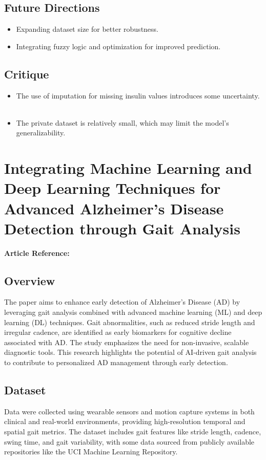 \subsection*{Future Directions}
\begin{itemize}
    \item Expanding dataset size for better robustness.
    \item Integrating fuzzy logic and optimization for improved prediction.
\end{itemize}

\subsection*{Critique}
\begin{itemize}
    \item The use of imputation for missing insulin values introduces some uncertainty.    
    \item The private dataset is relatively small, which may limit the model's generalizability.    
\end{itemize}

\section{Integrating Machine Learning and Deep Learning Techniques for Advanced Alzheimer's Disease Detection through Gait Analysis}
\textbf{Article Reference:} \cite{article_3}

\subsection*{Overview}
The paper aims to enhance early detection of Alzheimer's Disease (AD) by leveraging gait analysis combined with advanced machine learning (ML) and deep learning (DL) techniques. Gait abnormalities, such as reduced stride length and irregular cadence, are identified as early biomarkers for cognitive decline associated with AD. The study emphasizes the need for non-invasive, scalable diagnostic tools. This research highlights the potential of AI-driven gait analysis to contribute to personalized AD management through early detection.

\subsection*{Dataset}
Data were collected using wearable sensors and motion capture systems in both clinical and real-world environments, providing high-resolution temporal and spatial gait metrics. The dataset includes gait features like stride length, cadence, swing time, and gait variability, with some data sourced from publicly available repositories like the UCI Machine Learning Repository.

